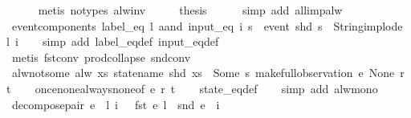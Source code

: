 \begin{isabellebody}
\ \ \ \ \isamarkupfalse%
\ {\isacharparenleft}metis\ {\isacharparenleft}no{\isacharunderscore}types{\isacharparenright}\ alw{\isacharunderscore}inv{\isacharparenright}\isanewline
\ \ \isamarkupfalse%
\ \isamarkupfalse%
\ {\isacharquery}thesis\isanewline
\ \ \ \ \isamarkupfalse%
\ {\isacharparenleft}simp\ add{\isacharcolon}\ all{\isacharunderscore}imp{\isacharunderscore}alw{\isacharparenright}\isanewline
{}\isamarkupfalse%
%
\endisatagproof
{\isafoldproof}%
%
\isadelimproof
\isanewline
%
\endisadelimproof
\isanewline
{}\isamarkupfalse%
\ event{\isacharunderscore}components{\isacharcolon}\ {\isachardoublequoteopen}{\isacharparenleft}label_eq\ l\ aand\ input_eq\ i{\isacharparenright}\ s\ {\isacharequal}\ {\isacharparenleft}event\ {\isacharparenleft}shd\ s{\isacharparenright}\ {\isacharequal}\ {\isacharparenleft}String{\isachardot}implode\ l{\isacharcomma}\ i{\isacharparenright}{\isacharparenright}{\isachardoublequoteclose}\isanewline
%
\isadelimproof
\ \ %
\endisadelimproof
%
\isatagproof
{}\isamarkupfalse%
\ {\isacharparenleft}simp\ add{\isacharcolon}\ label_eq{\isacharunderscore}def\ input_eq{\isacharunderscore}def{\isacharparenright}\isanewline
\ \ \isamarkupfalse%
\ {\isacharparenleft}metis\ fst{\isacharunderscore}conv\ prod{\isachardot}collapse\ snd{\isacharunderscore}conv{\isacharparenright}%
\endisatagproof
{\isafoldproof}%
%
\isadelimproof
\isanewline
%
\endisadelimproof
\isanewline
{}\isamarkupfalse%
\ alw{\isacharunderscore}not{\isacharunderscore}some{\isacharcolon}\ {\isachardoublequoteopen}alw\ {\isacharparenleft}{\isasymlambda}xs{\isachardot}\ statename\ {\isacharparenleft}shd\ xs{\isacharparenright}\ {\isasymnoteq}\ Some\ s{\isacharparenright}\ {\isacharparenleft}make{\isacharunderscore}full{\isacharunderscore}observation\ e\ None\ r\ t{\isacharparenright}{\isachardoublequoteclose}\isanewline
%
\isadelimproof
\ \ %
\endisadelimproof
%
\isatagproof
{}\isamarkupfalse%
\ once{\isacharunderscore}none{\isacharunderscore}always{\isacharunderscore}none{\isacharbrackleft}of\ e\ r\ t{\isacharbrackright}\isanewline
\ \ \isamarkupfalse%
\ state_eq{\isacharunderscore}def\isanewline
\ \ \isamarkupfalse%
\ {\isacharparenleft}simp\ add{\isacharcolon}\ alw{\isacharunderscore}mono{\isacharparenright}%
\endisatagproof
{\isafoldproof}%
%
\isadelimproof
\isanewline
%
\endisadelimproof
\isanewline
{}\isamarkupfalse%
\ decompose{\isacharunderscore}pair{\isacharcolon}\ {\isachardoublequoteopen}e\ {\isasymnoteq}\ {\isacharparenleft}l{\isacharcomma}\ i{\isacharparenright}\ {\isacharequal}\ {\isacharparenleft}{\isasymnot}\ {\isacharparenleft}fst\ e\ {\isacharequal}l\ {\isasymand}\ snd\ e\ {\isacharequal}\ i{\isacharparenright}{\isacharparenright}{\isachardoublequoteclose}\isanewline

\end{isabellebody}
